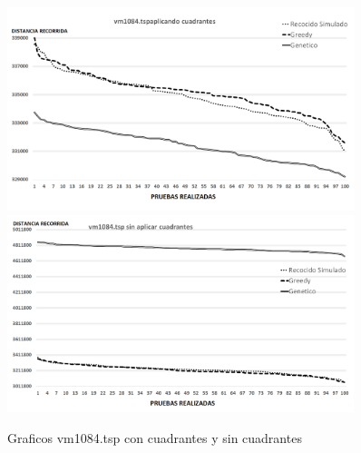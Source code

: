  \begin{figure}[hbtp]
    \centering
        \includegraphics[width=0.9\textwidth]{PruebasResultados/Experimentos_Graficos_Con/vm1084.png}
        \includegraphics[width=0.9\textwidth]{PruebasResultados/Experimentos_Graficos_Sin/vm1084.png}
        \caption{Graficos vm1084.tsp con cuadrantes y sin cuadrantes}
        \label{fig:vm1084_grafica.png}
\end{figure}
\newpage



       
